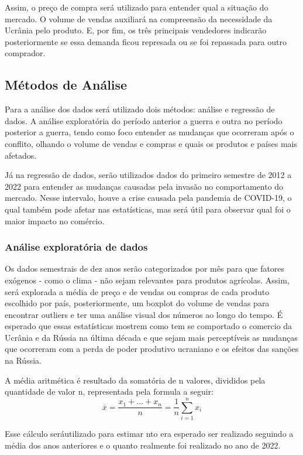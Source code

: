 \documentclass[12pt]{article}
\begin{document}
Assim, o preço de compra será utilizado para entender qual a situação do mercado. O volume de vendas auxiliará na compreensão da necessidade da Ucrânia pelo produto. E, por fim, os três principais vendedores indicarão posteriormente se essa demanda ficou represada ou se foi repassada para outro comprador.

\subsection{Métodos de Análise}

Para a análise dos dados será utilizado dois métodos: análise e regressão de dados. A análise exploratória do período anterior a guerra e outra no período posterior a guerra, tendo como foco entender as mudanças que ocorreram após o conflito, olhando o volume de vendas e compras e quais os produtos e países mais afetados.

Já na regressão de dados, serão utilizados dados do primeiro semestre de 2012 a 2022 para entender as mudanças causadas pela invasão no comportamento do mercado. Nesse intervalo, houve a crise causada pela pandemia de COVID-19, o qual também pode afetar nas estatísticas, mas será útil para observar qual foi o maior impacto no comércio. 

\subsubsection{Análise exploratória de dados}

Os dados semestrais de dez anos serão categorizados por mês para que fatores exógenos - como o clima - não sejam relevantes para produtos agrícolas. Assim, será explorada a média de preço e de vendas ou compras de cada produto escolhido por país, posteriormente, um boxplot do volume de vendas para encontrar outliers e ter uma análise visual dos números ao longo do tempo. É esperado que essas estatísticas mostrem como tem se comportado o comercio da Ucrânia e da Rússia na última década e que sejam mais perceptíveis as mudanças que ocorreram com a perda de poder produtivo ucraniano e os efeitos das sanções na Rússia.

A média aritmética é resultado da somatória de n valores, divididos pela quantidade de valor n, representada pela formula a seguir:
\[\overline{x} = \frac{x_1 + ... + x_n}{n} = \frac{1}{n}\sum_{i = 1}^{n}  x_i\]
	
Esse cálculo seráutilizado para estimar nto era esperado ser realizado seguindo a média dos anos anteriores e o quanto realmente foi realizado no ano de 2022. 
	
\end{document}
